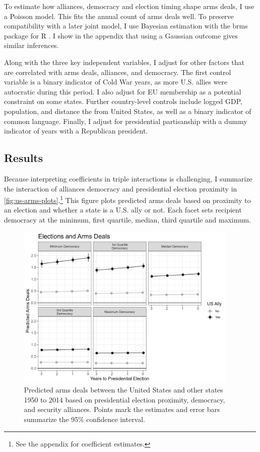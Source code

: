 \documentclass[12pt]{article}
\begin{document}
To estimate how alliances, democracy and election timing shape arms deals, I use a Poisson model.
This fits the annual count of arms deals well.
To preserve compatibility with a later joint model, I use Bayesian estimation with the brms package for \textsf{R} \citep{Buerkner2017}. 
I show in the appendix that using a Gaussian outcome gives similar inferences. 


Along with the three key independent variables, I adjust for other factors that are correlated with arms deals, alliances, and democracy. 
The first control variable is a binary indicator of Cold War years, as more U.S. allies were autocratic during this period. 
I also adjust for EU membership as a potential constraint on some states. 
Further country-level controls include logged GDP, population, and distance the from United States, as well as a binary indicator of common language. 
Finally, I adjust for presidential partisanship with a dummy indicator of years with a Republican president.  



\subsection{Results}


Because interpreting coefficients in triple interactions is challenging, I summarize the interaction of alliances democracy and presidential election proximity in \autoref{fig:us-arms-plots}.\footnote{See the appendix for coefficient estimates.}
This figure plots predicted arms deals based on proximity to an election and whether a state is a U.S. ally or not. 
Each facet sets recipient democracy at the minimum, first quartile, median, third quartile and maximum.


\begin{figure}[htpb]
	\centering
		\includegraphics[width=0.95\textwidth]{../figures/us-arms-plots.png}
	\caption{Predicted arms deals between the United States and other states 1950 to 2014 based on presidential election proximity, democracy, and security alliances. Points mark the estimates and error bars summarize the 95\% confidence interval.}
	\label{fig:us-arms-plots}
\end{figure}
\end{document}
